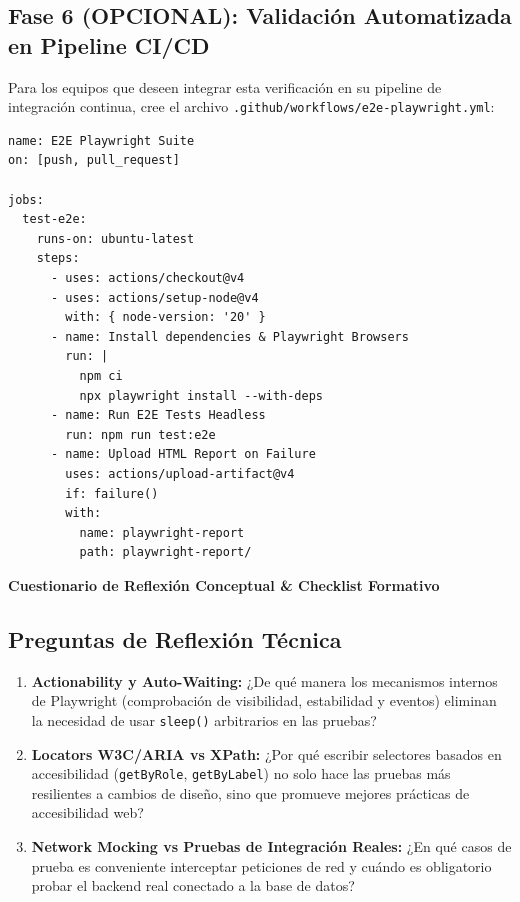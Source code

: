 \documentclass[10pt,letterpaper]{article}
\newcommand{\sectionBadge}[1]{%
  \refstepcounter{section}%
  \vspace{0.16cm}%
  \noindent%
  \colorbox{icesiBlue}{\color{white}\rule[-0.08cm]{0pt}{0.42cm}\hspace{0.16cm}\textbf{\normalsize \thesection}\hspace{0.16cm}}%
  \hspace{0.18cm}%
  {\fontsize{9.5}{12}\selectfont\textbf{\color{icesiDark}#1}}\\[-0.10cm]%
  \noindent{\color{icesiDark}\rule{\textwidth}{0.8pt}}\vspace{0.06cm}%
}
\begin{document}
\subsection{Fase 6 (OPCIONAL): Validación Automatizada en Pipeline CI/CD}
Para los equipos que deseen integrar esta verificación en su pipeline de integración continua, cree el archivo \texttt{.github/workflows/e2e-playwright.yml}:
\begin{lstlisting}[style=codeStyle]
name: E2E Playwright Suite
on: [push, pull_request]

jobs:
  test-e2e:
    runs-on: ubuntu-latest
    steps:
      - uses: actions/checkout@v4
      - uses: actions/setup-node@v4
        with: { node-version: '20' }
      - name: Install dependencies & Playwright Browsers
        run: |
          npm ci
          npx playwright install --with-deps
      - name: Run E2E Tests Headless
        run: npm run test:e2e
      - name: Upload HTML Report on Failure
        uses: actions/upload-artifact@v4
        if: failure()
        with:
          name: playwright-report
          path: playwright-report/
\end{lstlisting}

\sectionBadge{Cuestionario de Reflexión Conceptual \& Checklist Formativo}

\subsection{Preguntas de Reflexión Técnica}
\begin{enumerate}[leftmargin=*,itemsep=3pt]
  \item \textbf{Actionability y Auto-Waiting:} ¿De qué manera los mecanismos internos de Playwright (comprobación de visibilidad, estabilidad y eventos) eliminan la necesidad de usar \texttt{sleep()} arbitrarios en las pruebas?
  \item \textbf{Locators W3C/ARIA vs XPath:} ¿Por qué escribir selectores basados en accesibilidad (\texttt{getByRole}, \texttt{getByLabel}) no solo hace las pruebas más resilientes a cambios de diseño, sino que promueve mejores prácticas de accesibilidad web?
  \item \textbf{Network Mocking vs Pruebas de Integración Reales:} ¿En qué casos de prueba es conveniente interceptar peticiones de red y cuándo es obligatorio probar el backend real conectado a la base de datos?
\end{enumerate}
\end{document}
